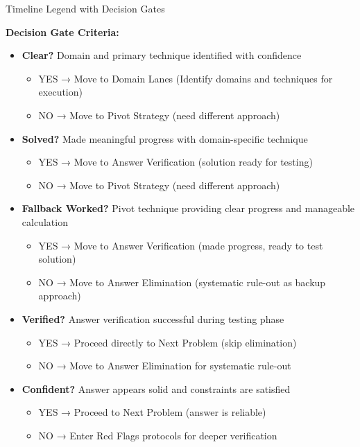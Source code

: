 \documentclass{article}
\begin{document}
\begin{timelinebox}{Timeline Legend with Decision Gates}
\begin{center}
  \end{center}
  \textbf{Decision Gate Criteria:}
  \begin{itemize}[nosep]
  \item \textbf{Clear?} Domain and primary technique identified with confidence
   \begin{itemize}[nosep]
      \item YES → Move to Domain Lanes (Identify domains and techniques for execution)
      \item NO → Move to Pivot Strategy (need different approach)
   \end{itemize}
  \item \textbf{Solved?} Made meaningful progress with domain-specific technique
     \begin{itemize}[nosep]
     \item YES → Move to Answer Verification (solution ready for testing)
     \item NO → Move to Pivot Strategy (need different approach)
     \end{itemize}
  \item \textbf{Fallback Worked?} Pivot technique providing clear progress and manageable calculation
     \begin{itemize}[nosep]
     \item YES → Move to Answer Verification (made progress, ready to test solution)
     \item NO → Move to Answer Elimination (systematic rule-out as backup approach)
     \end{itemize}
  \item \textbf{Verified?} Answer verification successful during testing phase
     \begin{itemize}[nosep]
     \item YES → Proceed directly to Next Problem (skip elimination)
     \item NO → Move to Answer Elimination for systematic rule-out
     \end{itemize}
  \item \textbf{Confident?} Answer appears solid and constraints are satisfied
     \begin{itemize}[nosep]
     \item YES → Proceed to Next Problem (answer is reliable)
     \item NO → Enter Red Flags protocols for deeper verification
     \end{itemize}
  \end{itemize}
  \end{timelinebox}
\end{document}
